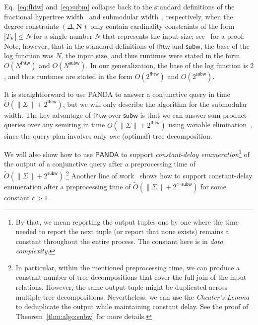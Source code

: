 \documentclass{theoretics}
\newcommand{\norm}[1]{\|#1\|}
\newcommand{\panda}{\textsf{PANDA}\xspace}
\newcommand{\fhtw}{\textsf{fhtw}}
\newcommand{\subm}{\textsf{subw}}
\begin{document}
\begin{remark}
Eq.~\eqref{eq:fhtw} and~\eqref{eq:subm} collapse back to the standard definitions of the fractional
hypertree width~\cite{DBLP:journals/talg/GroheM14} and submodular width~\cite{DBLP:journals/jacm/Marx13}, respectively, when the degree constraints $(\Delta, \bm N)$
only contain cardinality constraints of the form $|T_{\bm Y}| \leq N$ for a single number $N$ that represents the input size;
see~\cite{DBLP:conf/pods/Khamis0S17} for a proof.
Note, however, that in the standard definitions of $\fhtw$ and $\subm$,
the base of the log function was $N$, the input size, and thus runtimes were stated in the form
$O(N^{\fhtw})$ and $O(N^{\subm})$.  In our generalization, the base of the log function is
$2$, and thus runtimes are stated in the form $O(2^{\fhtw})$ and $O(2^{\subm})$.

It is straightforward to use \panda to answer a conjunctive query in time $\tilde
O(\norm{\Sigma}+ 2^{\fhtw})$, but we will only describe the algorithm for the
submodular width. The key advantage of $\fhtw$ over $\subm$ is that we can answer sum-product
queries over any semiring in time $\tilde O(\norm{\Sigma}+ 2^{\fhtw})$ using variable
elimination~\cite{DBLP:conf/pods/KhamisNR16}, since the query plan involves only {\em one}
(optimal) tree decomposition.

We will also show how to use $\panda$ to support {\em constant-delay enumeration}\footnote{By that, we mean reporting the output tuples one by one
where the time needed to report the next tuple (or report that none exists) remains a constant
throughout the entire process. The constant here is in {\em data complexity}.} of the output of a conjunctive query
after a preprocessing time of $\tilde O(\norm{\Sigma}+ 2^{\subm})$.\footnote{In particular, within the mentioned preprocessing time,
    we can produce a constant number of tree decompositions
    that cover the full join of the input relations.
    However, the same output tuple might be duplicated across multiple tree decompositions.
    Nevertheless, we can use the {\em Cheater's Lemma}~\cite{10.1145/3450263} to deduplicate
    the output while maintaining constant delay. See the proof of Theorem~\ref{thm:algo:subw} for more details.
}
Another line of work~\cite{berkholz_et_al:LIPIcs.MFCS.2019.58} shows how to support constant-delay enumeration after a preprocessing time of $\tilde O(\norm{\Sigma}+ 2^{c\cdot\subm})$
for some constant $c > 1$.
\end{remark}
\end{document}
